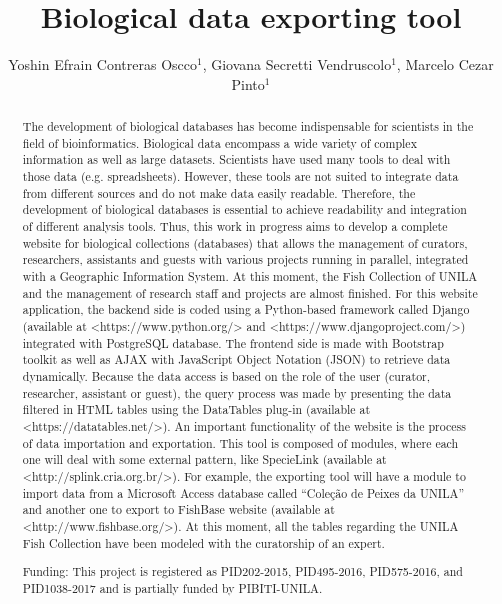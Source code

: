 \documentclass[twoside]{article}
\title{\vspace{-15mm}\fontsize{24pt}{10pt}\selectfont\textbf{Biological data exporting tool}} %
\author{Yoshin Efrain Contreras Oscco$^1$, Giovana Secretti Vendruscolo$^1$, Marcelo Cezar Pinto$^1$}
\affil{1 UNILA\\ }
\date{}
\begin{document}
\maketitle %

\thispagestyle{fancy} %


\begin{abstract}
The development of biological databases has become indispensable for scientists in the field of bioinformatics. Biological data encompass a wide variety of complex information as well as large datasets. Scientists have used many tools to deal with those data (e.g. spreadsheets). However, these tools are not suited to integrate data from different sources and do not make data easily readable. Therefore, the development of biological databases is essential to achieve readability and integration of different analysis tools. Thus, this work in progress aims to develop a complete website for biological collections (databases) that allows the management of curators, researchers, assistants and guests with various projects running in parallel, integrated with a Geographic Information System. At this moment, the Fish Collection of UNILA and the management of research staff and projects are almost finished. For this website application, the backend side is coded using a Python-based framework called Django (available at <https://www.python.org/> and <https://www.djangoproject.com/>) integrated with PostgreSQL database. The frontend side is made with Bootstrap toolkit as well as AJAX with JavaScript Object Notation (JSON) to retrieve data dynamically. Because the data access is based on the role of the user (curator, researcher, assistant or guest), the query process was made by presenting the data filtered in HTML tables using the DataTables plug-in (available at <https://datatables.net/>). An important functionality of the website is the process of data importation and exportation. This tool is composed of modules, where each one will deal with some external pattern, like SpecieLink (available at <http://splink.cria.org.br/>). For example, the exporting tool will have a module to import data from a Microsoft Access database called ``Cole\c{c}\~ao de Peixes da UNILA'' and another one to export to FishBase website (available at <http://www.fishbase.org/>). At this moment, all the tables regarding the UNILA Fish Collection have been modeled with the curatorship of an expert.

Funding: This project is registered as PID202-2015, PID495-2016, PID575-2016, and PID1038-2017 and is partially funded by PIBITI-UNILA.
\end{abstract}
\end{document}
